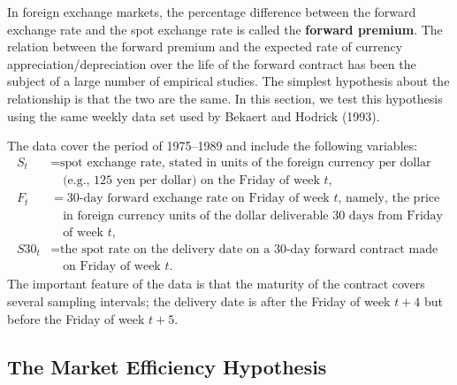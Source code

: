 
In foreign exchange markets, the percentage difference between the forward
exchange rate and the spot exchange rate is called the \textbf{forward premium}. The
relation between the forward premium and the expected rate of currency appreciation/depreciation
over the life of the forward contract has been the subject of a
large number of empirical studies. The simplest hypothesis about the relationship
is that the two are the same. In this section, we test this hypothesis using the same
weekly data set used by Bekaert and Hodrick (1993).

The data cover the period of 1975--1989 and include the following variables:
\begin{align*}
  S_t &= \text{spot exchange rate, stated in units of the foreign currency per dollar} \\
  &\quad \text{(e.g., 125 yen per dollar) on the Friday of week $t$,} \\
  F_t &= \text{30-day forward exchange rate on Friday of week $t$, namely, the price} \\
  &\quad \text{in foreign currency units of the dollar deliverable 30 days from Friday} \\
  &\quad \text{of week $t$,} \\
  S30_t &= \text{the spot rate on the delivery date on a 30-day forward contract made} \\
  &\quad \text{on Friday of week $t$.}
\end{align*}
The important feature of the data is that the maturity of the contract covers several
sampling intervals; the delivery date is after the Friday of week $t + 4$ but before the
Friday of week $t + 5$.

\subsection*{The Market Efficiency Hypothesis}

